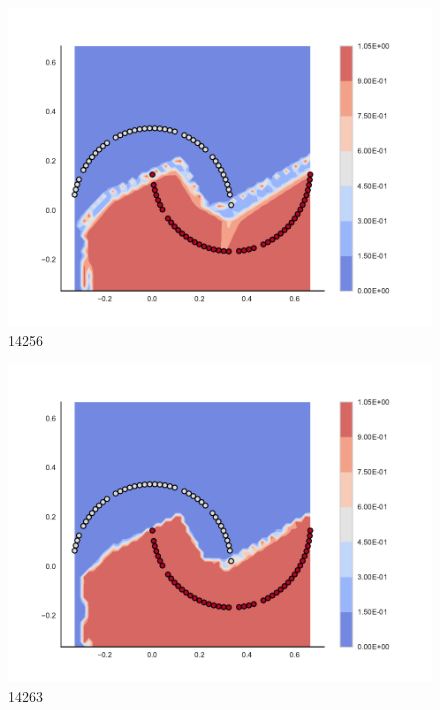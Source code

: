 \begin{subfigure}[b]{0.09\textwidth}
    \includegraphics[clip, trim=2.35cm 1.75cm 4.5cm 0cm,width=\textwidth]{img/convergence/14256.pdf}
    \caption{14256}
    \label{fig:convergence_14256}
\end{subfigure}
%
\begin{subfigure}[b]{0.09\textwidth}
    \includegraphics[clip, trim=2.35cm 1.75cm 4.5cm 0cm,width=\textwidth]{img/convergence/14263.pdf}
    \caption{14263}
    \label{fig:convergence_14263}
\end{subfigure}
%
